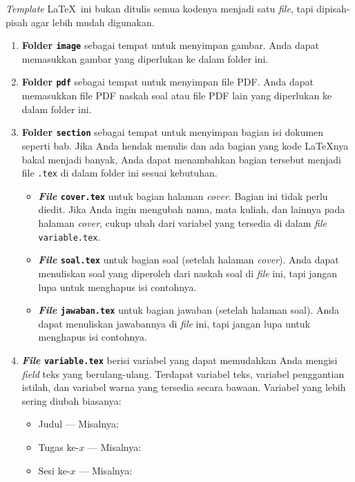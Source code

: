 \textit{Template} \LaTeX\ ini bukan ditulis semua kodenya menjadi satu \textit{file}, tapi dipisah-pisah agar lebih mudah digunakan.

\begin{enumerate}[]
    \item \textbf{Folder \texttt{image}} sebagai tempat untuk menyimpan gambar. Anda dapat memasukkan gambar yang diperlukan ke dalam folder ini.
    \item \textbf{Folder \texttt{pdf}} sebagai tempat untuk menyimpan file PDF. Anda dapat memasukkan file PDF naskah soal atau file PDF lain yang diperlukan ke dalam folder ini.
    \item \textbf{Folder \texttt{section}} sebagai tempat untuk menyimpan bagian isi dokumen seperti bab. Jika Anda hendak menulis dan ada bagian yang kode \LaTeX\-nya bakal menjadi banyak, Anda dapat menambahkan bagian tersebut menjadi file \texttt{.tex} di dalam folder ini sesuai kebutuhan.
    \begin{itemize}[]
        \item \textbf{\textit{File} \texttt{cover.tex}} untuk bagian halaman \textit{cover}. Bagian ini tidak perlu diedit. Jika Anda ingin mengubah nama, mata kuliah, dan lainnya pada halaman \textit{cover}, cukup ubah dari variabel yang tersedia di dalam \textit{file} \texttt{variable.tex}.
        \item \textbf{\textit{File} \texttt{soal.tex}} untuk bagian soal (setelah halaman \textit{cover}). Anda dapat menuliskan soal yang diperoleh dari naskah soal di \textit{file} ini, tapi jangan lupa untuk menghapus isi contohnya.
        \item \textbf{\textit{File} \texttt{jawaban.tex}} untuk bagian jawaban (setelah halaman soal). Anda dapat menuliskan jawabannya di \textit{file} ini, tapi jangan lupa untuk menghapus isi contohnya.
    \end{itemize}
    \item \textbf{\textit{File} \texttt{variable.tex}} berisi variabel yang dapat memudahkan Anda mengisi \textit{field} teks yang berulang-ulang. Terdapat variabel teks, variabel penggantian istilah, dan variabel warna yang tersedia secara bawaan. Variabel yang lebih sering diubah biasanya:
    \begin{itemize}[nosep]
        \item Judul --- Misalnya: \judul
        \item Tugas ke-$x$ --- Misalnya: \tugasKe
        \item Sesi ke-$x$ --- Misalnya: \sesiKe

\end{itemize}
\end{enumerate}
